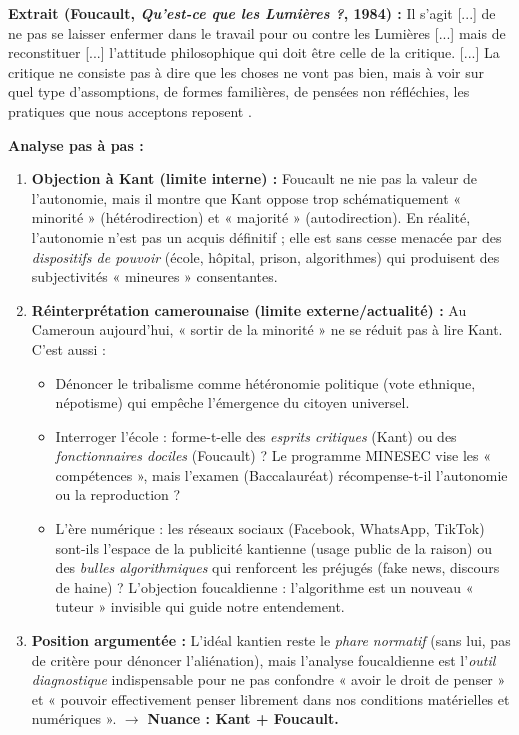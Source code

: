 \documentclass[11pt]{article}
\newcommand{\cle}[1]{{\popxbold\color{popdark}#1}}
\begin{document}
\begin{experience}
\textbf{Extrait (Foucault, \emph{Qu'est-ce que les Lumières ?}, 1984) :} \guillemotleft Il s'agit [...] de ne pas se laisser enfermer dans le travail pour ou contre les Lumières [...] mais de reconstituer [...] l'attitude philosophique qui doit être celle de la critique. [...] La critique ne consiste pas à dire que les choses ne vont pas bien, mais à voir sur quel type d'assomptions, de formes familières, de pensées non réfléchies, les pratiques que nous acceptons reposent \guillemotright.

\textbf{Analyse pas à pas :}
\begin{enumerate}
    \item \textbf{Objection à Kant (limite interne) :} Foucault ne nie pas la valeur de l'autonomie, mais il montre que Kant oppose trop schématiquement « minorité » (hétérodirection) et « majorité » (autodirection). En réalité, l'autonomie n'est pas un acquis définitif ; elle est sans cesse menacée par des \emph{dispositifs de pouvoir} (école, hôpital, prison, algorithmes) qui produisent des subjectivités « mineures » consentantes.
    \item \textbf{Réinterprétation camerounaise (limite externe/actualité) :} Au Cameroun aujourd'hui, « sortir de la minorité » ne se réduit pas à lire Kant. C'est aussi :
    \begin{itemize}
        \item Dénoncer le \cle{tribalisme} comme hétéronomie politique (vote ethnique, népotisme) qui empêche l'émergence du citoyen universel.
        \item Interroger l'école : forme-t-elle des \emph{esprits critiques} (Kant) ou des \emph{fonctionnaires dociles} (Foucault) ? Le programme MINESEC vise les « compétences », mais l'examen (Baccalauréat) récompense-t-il l'autonomie ou la reproduction ?
        \item L'ère numérique : les réseaux sociaux (Facebook, WhatsApp, TikTok) sont-ils l'espace de la \cle{publicité} kantienne (usage public de la raison) ou des \emph{bulles algorithmiques} qui renforcent les préjugés (fake news, discours de haine) ? L'objection foucaldienne : l'algorithme est un nouveau « tuteur » invisible qui guide notre entendement.
    \end{itemize}
    \item \textbf{Position argumentée :} L'idéal kantien reste le \emph{phare normatif} (sans lui, pas de critère pour dénoncer l'aliénation), mais l'analyse foucaldienne est l'\emph{outil diagnostique} indispensable pour ne pas confondre « avoir le droit de penser » et « pouvoir effectivement penser librement dans nos conditions matérielles et numériques ». $\rightarrow$ \textbf{Nuance : Kant + Foucault.}
\end{enumerate}
\end{experience}
\end{document}
